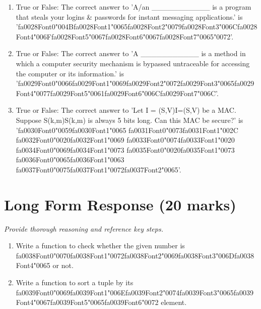 \documentclass[12pt]{article}
\begin{document}
\begin{enumerate}[label=\arabic*.]
\item True or False: The correct answer to 'A/an \_\_\_\_\_\_\_\_\_\_\_ is a program that steals your logins \& passwords for instant messaging applications.' is '{\csname fa0028Font0\endcsname\char"004B}{\csname fa0028Font1\endcsname\char"0065}{\csname fa0028Font2\endcsname\char"0079}{\csname fa0028Font3\endcsname\char"006C}{\csname fa0028Font4\endcsname\char"006F}{\csname fa0028Font5\endcsname\char"0067}{\csname fa0028Font6\endcsname\char"0067}{\csname fa0028Font7\endcsname\char"0065}{\char"0072}'.
\item True or False: The correct answer to 'A \_\_\_\_\_\_\_\_\_\_\_ is a method in which a computer security mechanism is bypassed untraceable for accessing the computer or its information.' is '{\csname fa0029Font0\endcsname\char"0066}{\csname fa0029Font1\endcsname\char"0069}{\csname fa0029Font2\endcsname\char"0072}{\csname fa0029Font3\endcsname\char"0065}{\csname fa0029Font4\endcsname\char"0077}{\csname fa0029Font5\endcsname\char"0061}{\csname fa0029Font6\endcsname\char"006C}{\csname fa0029Font7\endcsname\char"006C}'.
\item True or False: The correct answer to 'Let I = (S,V)I=(S,V) be a MAC. Suppose S(k,m)S(k,m) is always 5 bits long. Can this MAC be secure?' is '{\csname fa0030Font0\endcsname\char"0059}{\csname fa0030Font1\endcsname\char"0065} {\csname fa0031Font0\endcsname\char"0073}{\csname fa0031Font1\endcsname\char"002C} {\csname fa0032Font0\endcsname\char"0020}{\csname fa0032Font1\endcsname\char"0069} {\csname fa0033Font0\endcsname\char"0074}{\csname fa0033Font1\endcsname\char"0020} {\csname fa0034Font0\endcsname\char"0069}{\csname fa0034Font1\endcsname\char"0073} {\csname fa0035Font0\endcsname\char"0020}{\csname fa0035Font1\endcsname\char"0073} {\csname fa0036Font0\endcsname\char"0065}{\csname fa0036Font1\endcsname\char"0063} {\csname fa0037Font0\endcsname\char"0075}{\csname fa0037Font1\endcsname\char"0072}{\csname fa0037Font2\endcsname\char"0065}'.
\end{enumerate}

\section*{Long Form Response (20 marks)}
\textit{Provide thorough reasoning and reference key steps.}
\begin{enumerate}[label=\arabic*.]
\item Write a function to check whether the given number is {\csname fa0038Font0\endcsname\char"0070}{\csname fa0038Font1\endcsname\char"0072}{\csname fa0038Font2\endcsname\char"0069}{\csname fa0038Font3\endcsname\char"006D}{\csname fa0038Font4\endcsname\char"0065} or not.
\item Write a function to sort a tuple by its {\csname fa0039Font0\endcsname\char"0069}{\csname fa0039Font1\endcsname\char"006E}{\csname fa0039Font2\endcsname\char"0074}{\csname fa0039Font3\endcsname\char"0065}{\csname fa0039Font4\endcsname\char"0067}{\csname fa0039Font5\endcsname\char"0065}{\csname fa0039Font6\endcsname\char"0072} element.
\end{enumerate}
\end{document}
